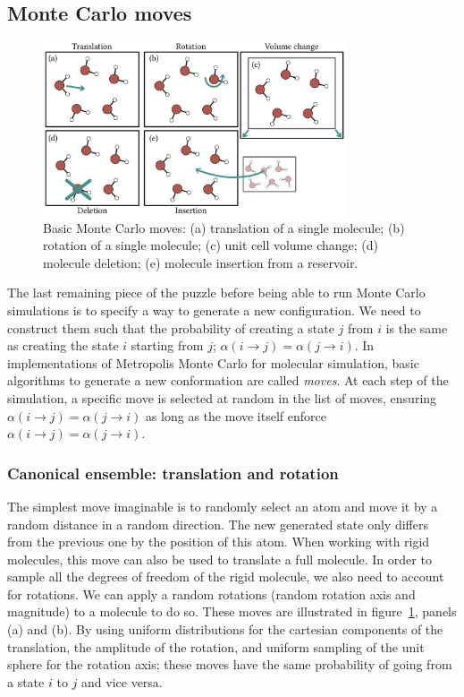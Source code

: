 \documentclass[thesis]{subfiles}
\begin{document}
\subsection{Monte Carlo moves}

\begin{figure}[t]
    \centering
    \includegraphics[width=0.8\textwidth]{figures/images/mc-moves}
    \caption{Basic Monte Carlo moves: (a) translation of a single molecule; (b)
    rotation of a single molecule; (c) unit cell volume change; (d) molecule
    deletion; (e) molecule insertion from a reservoir.}
    \label{fig:mc:moves}
\end{figure}

The last remaining piece of the puzzle before being able to run Monte Carlo
simulations is to specify a way to generate a new configuration. We need to
construct them such that the probability of creating a state $j$ from $i$ is the
same as creating the state $i$ starting from $j$; \ie $\alpha(i \to j) =
\alpha(j \to i)$. In implementations of Metropolis Monte Carlo for molecular
simulation, basic algorithms to generate a new conformation are called
\emph{moves}. At each step of the simulation, a specific move is selected at
random in the list of moves, ensuring $\alpha(i \to j) = \alpha(j \to i)$ as
long as the move itself enforce $\alpha(i \to j) = \alpha(j \to i)$.

\subsubsection{Canonical ensemble: translation and rotation}

The simplest move imaginable is to randomly select an atom and move it by a
random distance in a random direction. The new generated state only differs from
the previous one by the position of this atom. When working with rigid
molecules, this move can also be used to translate a full molecule. In order to
sample all the degrees of freedom of the rigid molecule, we also need to account
for rotations. We can apply a random rotations (random rotation axis and
magnitude) to a molecule to do so. These moves are illustrated in
figure~\ref{fig:mc:moves}, panels (a) and (b). By using uniform distributions
for the cartesian components of the translation, the amplitude of the rotation,
and uniform sampling of the unit sphere for the rotation axis; these moves have
the same probability of going from a state $i$ to $j$ and vice versa.
\end{document}

